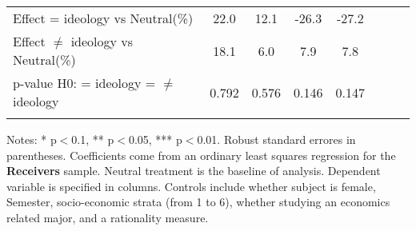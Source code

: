 \begin{table}[H]
{\begin{threeparttable}
\begin{tabular}{lccccccc}
\midrule
Effect = ideology vs Neutral(\%)&        22.0         &        12.1         &       -26.3         &       -27.2         \\
Effect $\neq$ ideology vs Neutral(\%)&        18.1         &         6.0         &         7.9         &         7.8         \\
p-value H0: = ideology = $\neq$ ideology&       0.792         &       0.576         &       0.146         &       0.147         \\
\bottomrule[0.5pt]                                                                               \label{tab:table2}                                                                       \end{tabular}                                                                                                    \vspace{-13pt}                                                                                           \begin{tablenotes}[flushleft]{\setlength{\itemindent}{-3pt}}          \small                                                                                                           \item Notes: * p$<$0.1, ** p$<$0.05, *** p$<$0.01. Robust standard errores in parentheses. Coefficients come from an ordinary least squares regression for the \textbf{Receivers} sample. Neutral treatment is the baseline of analysis. Dependent variable is specified in columns. Controls include whether subject is female, Semester, socio-economic strata (from 1 to 6), whether studying an economics related major, and a rationality measure.          \end{tablenotes}                                                                                         \end{threeparttable}                                                                             }                                                                                                                        \end{table}
